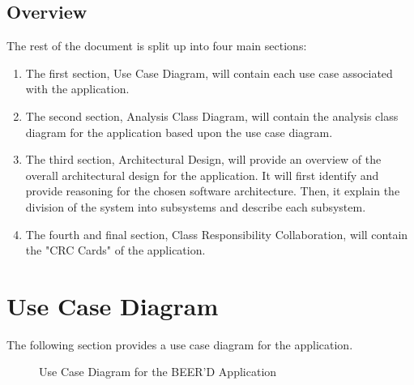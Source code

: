 \documentclass[]{article}
\begin{document}
\subsection{Overview}
\label{sub:overview}
The rest of the document is split up into four main sections:
\begin{enumerate}[-]
	\item The first section, Use Case Diagram, will contain each use case associated with the application. 
	\item The second section, Analysis Class Diagram, will contain the analysis class diagram for the application based upon the use case diagram.
	\item The third section, Architectural Design, will provide an overview of the overall architectural design for the application. It will first identify and provide reasoning for the chosen software architecture. Then, it explain the division of the system into subsystems and describe each subsystem.
	\item The fourth and final section, Class Responsibility Collaboration, will contain the "CRC Cards" of the application.
\end{enumerate}

\newpage
\section{Use Case Diagram}
\label{sec:use_case_diagram}
The following section provides a use case diagram for the application. \\

\begin{figure}[!ht]
\caption{Use Case Diagram for the BEER'D Application}
\end{figure}
\end{document}
